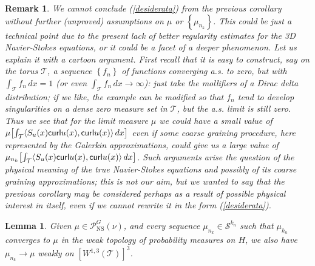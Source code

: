 \documentclass[11pt]{preprint}
\newtheorem{lemma}[theorem]{Lemma}
\newtheorem{remark}[theorem]{Remark}
\begin{document}
\begin{remark}
We cannot conclude (\ref{desiderata}) from the previous corollary without
further (unproved) assumptions on $\mu$ or $\left\{  \mu_{n_{k}}\right\}  $.
This could be just a technical point due to the present lack of better
regularity estimates for the 3D Navier-Stokes equations, or it could be a
facet of a deeper phenomenon. Let us explain it with a cartoon argument. First
recall that it is easy to construct, say on the torus $\mathcal{T}$, a
sequence $\left\{  f_{n}\right\}  $ of functions converging a.s. to zero, but
with $\int_{\mathcal{T}}f_{n}\,dx=1$ (or even $\int_{\mathcal{T}}%
f_{n}\,dx\rightarrow\infty$): just take the mollifiers of a Dirac delta
distribution; if we like, the example can be modified so that $f_{n}$ tend to
develop singularities on a dense zero measure set in $\mathcal{T}$, but the
a.s. limit is still zero. Thus we see that for the limit measure $\mu$ we
could have a small value of $\mu\left[  \int_{\mathcal{T}}\scal{S_{u}%
\left( x\right) \mathsf{curl}u\left( x\right),
\mathsf{curl}u\left( x\right)}\,dx\right]  $ even if some coarse graining
procedure, here represented by the Galerkin approximations, could give us a
large value of $\mu_{n_{k}}\left[  \int_{\mathcal{T}}\scal{S_{u}\left(
x\right) \mathsf{curl}u\left( x\right), \mathsf{curl}u\left( x\right
)}\,dx\right]  $. Such arguments arise the question of the physical meaning of
the true Navier-Stokes equations and possibly of its coarse graining
approximations; this is not our aim, but we wanted to say that the previous
corollary may be considered perhaps as a result of possible physical interest
in itself, even if we cannot rewrite it in the form (\ref{desiderata}). \ 
\end{remark}

\begin{lemma}
Given $\mu\in\mathcal{P}_{{\mathrm{NS}}}^{G}\left(  \nu\right)  $, and every
sequence $\mu_{n_{k}}\in\mathcal{S}^{k_{n}}$ such that $\mu_{k_{n}}$ converges
to $\mu$ in the weak topology of probability measures on $H$, we also have
$\mu_{n_{k}}\rightarrow\mu$ weakly on $\left[  W^{1,3}\left(  \mathcal{T}%
\right)  \right]  ^{3}$.
\end{lemma}
\end{document}
